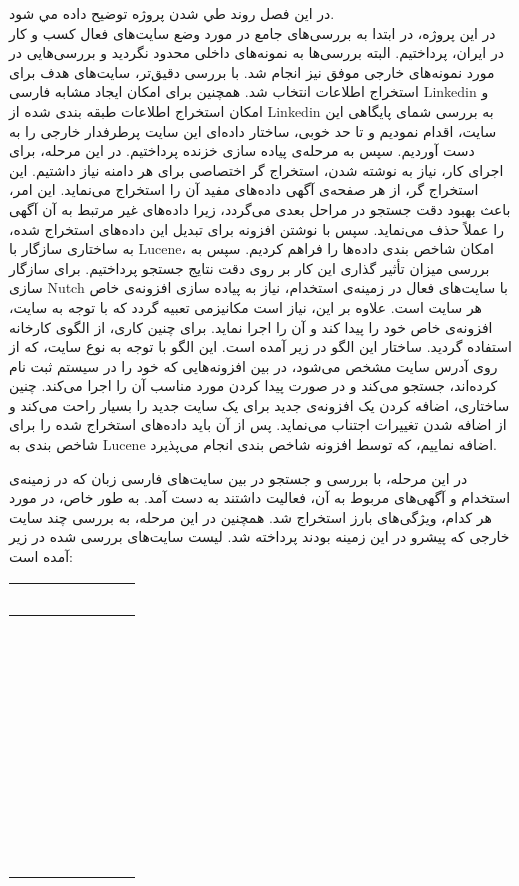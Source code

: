 
در اين فصل روند طي شدن پروژه توضيح داده مي شود.
\\
در این پروژه، در ابتدا به بررسی‌های جامع در مورد وضع سایت‌های فعال کسب و کار در ایران، پرداختیم. البته بررسی‌ها به نمونه‌های داخلی محدود نگردید و بررسی‌هایی در مورد نمونه‌های خارجی موفق نیز انجام شد. با بررسی دقیق‌تر، سایت‌های هدف برای استخراج اطلاعات انتخاب شد. همچنین برای امکان ایجاد مشابه فارسی Linkedin و امکان استخراج اطلاعات طبقه بندی شده از Linkedin به بررسی شمای پایگاهی این سایت، اقدام نمودیم و تا حد خوبی، ساختار داده‌ای این سایت پرطرفدار خارجی را به دست آوردیم. سپس به مرحله‌ی پیاده سازی خزنده پرداختیم. در این مرحله، برای اجرای کار، نیاز به نوشته شدن، استخراج گر اختصاصی برای هر دامنه نیاز داشتیم. این استخراج گر، از هر صفحه‌ی آگهی داده‌های مفید آن را استخراج می‌نماید. این امر، باعث بهبود دقت جستجو در مراحل بعدی می‌گردد، زیرا داده‌های غیر مرتبط به آن آگهی را عملاً حذف می‌نماید. سپس با نوشتن افزونه برای تبدیل این داده‌های استخراج شده، به ساختاری سازگار با Lucene، امکان شاخص بندی داده‌ها را فراهم کردیم. سپس به بررسی میزان تأثیر گذاری این کار بر روی دقت نتایج جستجو پرداختیم.
برای سازگار سازی Nutch با سایت‌های فعال در زمینه‌ی استخدام، نیاز به پیاده سازی افزونه‌ی خاص هر سایت است. علاوه بر این، نیاز است مکانیزمی تعبیه گردد که با توجه به سایت، افزونه‌ی خاص خود را پیدا کند و آن را اجرا نماید. برای چنین کاری، از الگوی کارخانه استفاده گردید. ساختار این الگو در زیر آمده است. این الگو با توجه به نوع سایت، که از روی آدرس سایت مشخص می‌شود، در بین افزونه‌هایی که خود را در سیستم ثبت نام کرده‌اند، جستجو می‌کند و در صورت پیدا کردن مورد مناسب آن را اجرا می‌کند. چنین ساختاری، اضافه کردن یک افزونه‌ی جدید برای یک سایت جدید را بسیار راحت می‌کند و از اضافه شدن تغییرات اجتناب می‌نماید. پس از آن باید داده‌های استخراج شده را برای شاخص بندی به Lucene اضافه نماییم، که توسط افزونه شاخص بندی انجام می‌پذیرد.

در این مرحله، با بررسی و جستجو در بین سایت‌های فارسی زبان که در زمینه‌ی استخدام و آگهی‌های مربوط به آن، فعالیت داشتند به دست آمد. به طور خاص، در مورد هر کدام، ویژگی‌های بارز استخراج شد. همچنین در این مرحله، به بررسی چند سایت خارجی که پیشرو در این زمینه بودند پرداخته شد. لیست سایت‌های بررسی شده در زیر آمده است:



\begin{table}
    \begin{tabular}{l|l|l|l|l}
    \hline
    ~ & ~ & ~ & ~ & ~ \\ \hline
    ~ & ~ & ~ & ~ & ~ \\
    ~ & ~ & ~ & ~ & ~ \\
    ~ & ~ & ~ & ~ & ~ \\
    ~ & ~ & ~ & ~ & ~ \\
    ~ & ~ & ~ & ~ & ~ \\
    ~ & ~ & ~ & ~ & ~ \\
    ~ & ~ & ~ & ~ & ~ \\
    ~ & ~ & ~ & ~ & ~ \\
    ~ & ~ & ~ & ~ & ~ \\
    \end{tabular}
\end{table}






